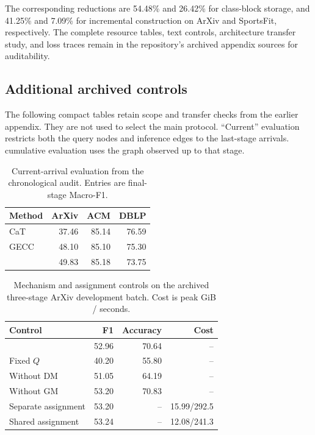 The corresponding reductions are 54.48\% and 26.42\% for class-block
storage, and 41.25\% and 7.09\% for incremental construction on ArXiv and
SportsFit, respectively. The complete resource tables, text controls,
architecture transfer study, and loss traces remain in the repository's
archived appendix sources for auditability.

\subsection{Additional archived controls}

The following compact tables retain scope and transfer checks from the earlier
appendix. They are not used to select the main protocol. ``Current'' evaluation
restricts both the query nodes and inference edges to the last-stage arrivals.
cumulative evaluation uses the graph observed up to that stage.

\begin{table}[H]
\centering
\scriptsize
\setlength{\tabcolsep}{3pt}
\caption{Current-arrival evaluation from the chronological audit. Entries are
final-stage Macro-F1.}
\label{tab:compact_current}
\begin{tabular*}{\linewidth}{@{\extracolsep{\fill}}lrrr@{}}
\toprule
Method & ArXiv & ACM & DBLP\\
\midrule
CaT & 37.46 & 85.14 & 76.59\\
GECC & 48.10 & 85.10 & 75.30\\
\method{} & 49.83 & 85.18 & 73.75\\
\bottomrule
\end{tabular*}
\end{table}

\begin{table}[H]
\centering
\scriptsize
\setlength{\tabcolsep}{2.5pt}
\caption{Mechanism and assignment controls on the archived three-stage ArXiv
development batch. Cost is peak GiB / seconds.}
\label{tab:compact_controls}
\begin{tabular*}{\linewidth}{@{\extracolsep{\fill}}lrrr@{}}
\toprule
Control & F1 & Accuracy & Cost\\
\midrule
\method{} & 52.96 & 70.64 & --\\
Fixed $Q$ & 40.20 & 55.80 & --\\
Without DM & 51.05 & 64.19 & --\\
Without GM & 53.20 & 70.83 & --\\
Separate assignment & 53.20 & -- & 15.99/292.5\\
Shared assignment & 53.24 & -- & 12.08/241.3\\
\bottomrule
\end{tabular*}
\end{table}

